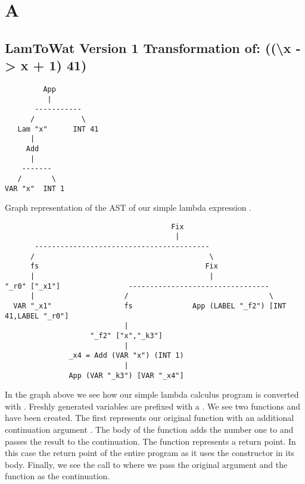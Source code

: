 

\chapter{\label{apdx:a}A}

\section{\label{section:v1printsimple}LamToWat Version 1 Transformation of: ((\textbackslash x -> x + 1) 41)}
\begin{landscape}
\begin{lstlisting}
         App
          |
       -----------
      /           \
   Lam "x"      INT 41
      |
     Add
      |
    -------
   /       \
VAR "x"  INT 1

\end{lstlisting}
Graph representation of the AST of our simple lambda expression .
\end{landscape}
\clearpage

\begin{landscape}
\begin{lstlisting}
                                       Fix
                                        |
       -----------------------------------------
      /                                         \
      fs                                       Fix
      |                                         |
"_r0" ["_x1"]                ---------------------------------
      |                     /                                 \
  VAR "_x1"                 fs              App (LABEL "_f2") [INT 41,LABEL "_r0"]
                            |
                    "_f2" ["x","_k3"]
                            |
               _x4 = Add (VAR "x") (INT 1)
                            |
               App (VAR "_k3") [VAR "_x4"]

\end{lstlisting}
In the graph above we see how our simple lambda calculus program is converted with . Freshly generated variables are prefixed with a \icode{_}. We see two functions  and  have been created. The first represents our original function with an additional continuation argument . The body of the function adds the number one to  and passes the result to the continuation. The  function represents a return point. In this case the return point of the entire program as it uses the  constructor in its body. Finally, we see the call to  where we pass the original argument and the  function as the continuation.
\end{landscape}
\clearpage

